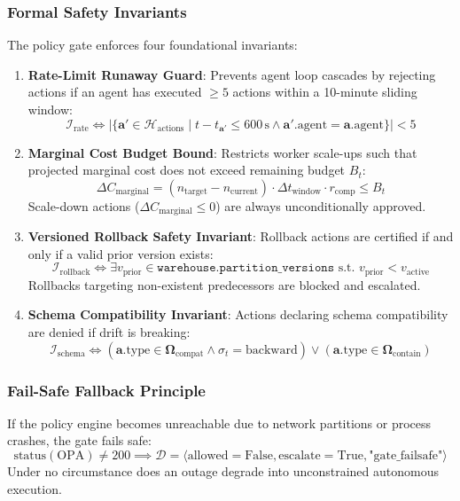 \subsubsection{Formal Safety Invariants}
The policy gate enforces four foundational invariants:
\begin{enumerate}
    \item \textbf{Rate-Limit Runaway Guard}: Prevents agent loop cascades by rejecting actions if an agent has executed $\ge 5$ actions within a 10-minute sliding window:
    \begin{equation}
    \mathcal{I}_{\text{rate}} \iff \big|\{ \mathbf{a}' \in \mathcal{H}_{\text{actions}} \mid t - t_{\mathbf{a}'} \le 600\,\text{s} \land \mathbf{a}'.\text{agent} = \mathbf{a}.\text{agent} \}\big| < 5
    \end{equation}
    \item \textbf{Marginal Cost Budget Bound}: Restricts worker scale-ups such that projected marginal cost does not exceed remaining budget $B_t$:
    \begin{equation}
    \Delta C_{\text{marginal}} = (n_{\text{target}} - n_{\text{current}}) \cdot \Delta t_{\text{window}} \cdot r_{\text{comp}} \le B_t
    \end{equation}
    Scale-down actions ($\Delta C_{\text{marginal}} \le 0$) are always unconditionally approved.
    \item \textbf{Versioned Rollback Safety Invariant}: Rollback actions are certified if and only if a valid prior version exists:
    \begin{equation}
    \mathcal{I}_{\text{rollback}} \iff \exists v_{\text{prior}} \in \texttt{warehouse.partition\_versions} \text{ s.t. } v_{\text{prior}} < v_{\text{active}}
    \end{equation}
    Rollbacks targeting non-existent predecessors are blocked and escalated.
    \item \textbf{Schema Compatibility Invariant}: Actions declaring schema compatibility are denied if drift is breaking:
    \begin{equation}
    \mathcal{I}_{\text{schema}} \iff (\mathbf{a}.\text{type} \in \mathbf{\Omega}_{\text{compat}} \land \sigma_t = \text{backward}) \lor (\mathbf{a}.\text{type} \in \mathbf{\Omega}_{\text{contain}})
    \end{equation}
\end{enumerate}

\subsubsection{Fail-Safe Fallback Principle}
If the policy engine becomes unreachable due to network partitions or process crashes, the gate fails safe:
\begin{equation}
\text{status}(\text{OPA}) \neq 200 \implies \mathcal{D} = \langle \text{allowed} = \text{False}, \text{escalate} = \text{True}, \text{"gate\_failsafe"} \rangle
\end{equation}
Under no circumstance does an outage degrade into unconstrained autonomous execution.

